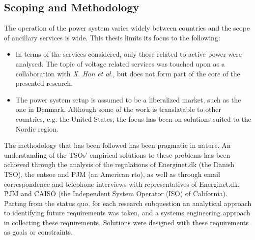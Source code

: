 \subsection*{Scoping and Methodology}
The operation of the power system varies widely between countries and the scope of ancillary services is wide. This thesis limits its focus to the following:
\begin{itemize}
	\item In terms of the services considered, only those related to active power were analysed. The topic of voltage related services was touched upon as a collaboration with \emph{X. Han et al.}, but does not form part of the core of the presented research.
	\item The power system setup is assumed to be a liberalized market, such as the one in Denmark. Although some of the work is translatable to other countries, e.g. the United States, the focus has been on solutions suited to the Nordic region.
\end{itemize}

The methodology that has been followed has been pragmatic in nature. An understanding of the TSOs' empirical solutions to these problems has been achieved through the analysis of the regulations of Energinet.dk (the Danish TSO), the \gls{entsoe} and PJM (an American \gls{rto}), as well as through email correspondence and telephone interviews with representatives of Energinet.dk, PJM and CAISO (the Independent System Operator (ISO) of California). Parting from the status quo, for each research subquestion an analytical approach to identifying future requirements was taken, and a systems engineering approach in collecting these requirements. Solutions were designed with these requirements as goals or constraints.

